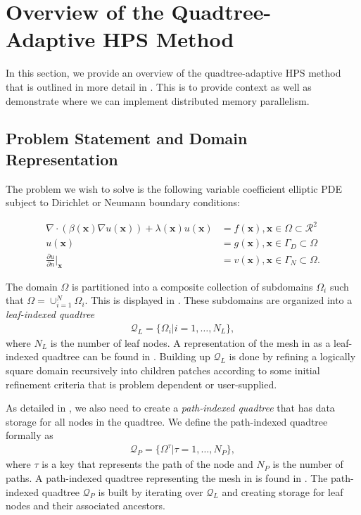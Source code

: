 \section{Overview of the Quadtree-Adaptive HPS Method}
\label{sec:overview-of-the-quadtree-adaptive-hps-method}

In this section, we provide an overview of the quadtree-adaptive HPS method that is outlined in more detail in \citep{chipman2024fast}. This is to provide context as well as demonstrate where we can implement distributed memory parallelism.

\subsection{Problem Statement and Domain Representation}
\label{sub:problem-statement-and-domain-representation}

The problem we wish to solve is the following variable coefficient elliptic PDE subject to Dirichlet or Neumann boundary conditions:

\begin{align}
    \label{eq:elliptic-pde}
    \nabla \cdot \left( \beta(\textbf{x}) \nabla u(\textbf{x}) \right) + \lambda(\textbf{x}) u(\textbf{x}) &= f(\textbf{x}), \textbf{x} \in \Omega \subset \mathcal{R}^2 \\
    \label{eq:elliptic-pde-bc1}
    u(\textbf{x}) &= g(\textbf{x}), \textbf{x} \in \Gamma_D \subset \Omega \\
    \label{eq:elliptic-pde-bc2}
    \frac{\partial u}{\partial n} \Big|_{\textbf{x}} &= v(\textbf{x}), \textbf{x} \in \Gamma_N \subset \Omega.
\end{align}

The domain $\Omega$ is partitioned into a composite collection of subdomains $\Omega_i$ such that $\Omega = \cup_{i = 1}^{N} \Omega_i$. This is displayed in . These subdomains are organized into a {\em leaf-indexed quadtree}
\begin{align}
    \mathcal{Q}_L = \{\Omega_i | i = 1, \dots, N_L\},
\end{align}
where $N_L$ is the number of leaf nodes. A representation of the mesh in  as a leaf-indexed quadtree can be found in . Building up $\mathcal{Q}_L$ is done by refining a logically square domain recursively into children patches according to some initial refinement criteria that is problem dependent or user-supplied.

As detailed in \citep{chipman2024fast}, we also need to create a {\em path-indexed quadtree} that has data storage for all nodes in the quadtree. We define the path-indexed quadtree formally as
\begin{align}
    \mathcal{Q}_P = \{\Omega^{\tau} | \tau = 1, \dots, N_P\},
\end{align}
where $\tau$ is a key that represents the path of the node and $N_P$ is the number of paths. A path-indexed quadtree representing the mesh in  is found in . The path-indexed quadtree $\mathcal{Q}_P$ is built by iterating over $\mathcal{Q}_L$ and creating storage for leaf nodes and their associated ancestors.

